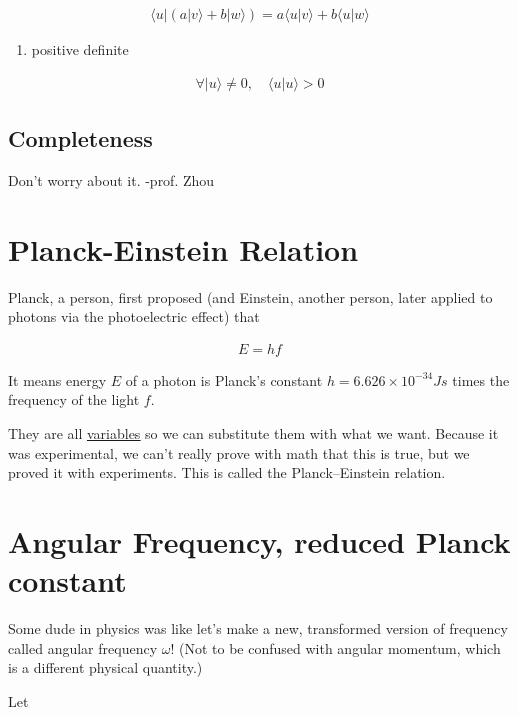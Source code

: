 \documentclass[
]{article}
\providecommand{\tightlist}{%
  \setlength{\itemsep}{0pt}\setlength{\parskip}{0pt}}
\let\oldhyperref\hyperref
\renewcommand{\hyperref}[2][]{\oldhyperref[#1]{\underline{#2}}}
\begin{document}
\begin{gather*}
	\langle u|(a|v\rangle + b|w\rangle) = a\langle u|v\rangle + b\langle u|w\rangle
\end{gather*}

\begin{enumerate}
	\def\labelenumi{\arabic{enumi}.}
	\tightlist
	\item
	      positive definite
\end{enumerate}

\begin{gather*}
	\forall |u\rangle \neq 0, \quad \langle u|u\rangle > 0
\end{gather*}

\subsection{Completeness}\label{completeness}

Don't worry about it. -prof. Zhou
\section{Planck-Einstein Relation}\label{planck-einstein-relation}

Planck, a person, first proposed (and Einstein, another person, later
applied to photons via the photoelectric effect) that

\begin{gather*}
	E=hf
\end{gather*}

It means energy \(E\) of a photon is Planck's constant
\(h=6.626\times 10^{-34}Js\) times the frequency of the light \(f\).

They are all \hyperref[variable]{variables} so we can substitute them with what we want.
Because it was experimental, we can't really prove with math that this
is true, but we proved it with experiments. This is called the
Planck--Einstein relation.

\section{Angular Frequency, reduced Planck
  constant}\label{angular-frequency-reduced-planck-constant}

Some dude in physics was like let's make a new, transformed version of
frequency called angular frequency \(\omega\)! (Not to be confused with
angular momentum, which is a different physical quantity.)

Let
\end{document}
